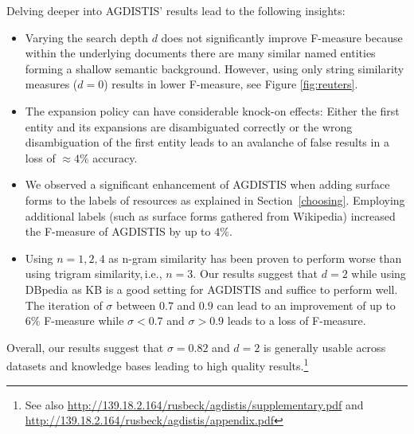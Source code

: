 Delving deeper into AGDISTIS' results lead to the following insights:
\begin{itemize}
\item Varying the search depth $d$ does not significantly improve \mbox{F-measure} because within the underlying documents there are many similar named entities forming a shallow semantic background. However, using only string similarity measures ($d=0$) results in lower F-measure, see Figure \ref{fig:reuters}. %
\item The expansion policy can have considerable knock-on effects: Either the first entity and its expansions are disambiguated correctly or the wrong disambiguation of the first entity leads to an avalanche of false results in a loss of $\approx 4\%$ accuracy.
\item We observed a significant enhancement of AGDISTIS when adding surface forms to the labels of resources as explained in Section~\ref{choosing}.
Employing additional labels (such as surface forms gathered from Wikipedia) increased the \mbox{F-measure} of AGDISTIS by up to $4\%$. 
\item Using $n=1,2,4$ as n-gram similarity has been proven to perform worse than using trigram similarity,\,i.e., $n=3$.
Our results suggest that $d=2$ while using DBpedia as \ac{KB} is a good setting for AGDISTIS and suffice to perform well. 
The iteration of $\sigma$ between $0.7$ and $0.9$ can lead to an improvement of up to $6\%$ \mbox{F-measure} while $\sigma<0.7$ and $\sigma>0.9$ leads to a loss of F-measure.
\end{itemize}


Overall, our results suggest that $\sigma=0.82$ and $d=2$ is generally usable across datasets and knowledge bases leading to high quality results.\footnote{See also \url{http://139.18.2.164/rusbeck/agdistis/supplementary.pdf} and \url{http://139.18.2.164/rusbeck/agdistis/appendix.pdf}}


